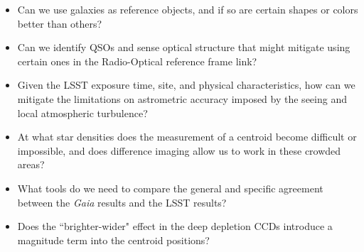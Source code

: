 \begin{itemize}
\item Can we use galaxies as reference objects, and if so are certain
shapes or colors better than others?
\item Can we identify QSOs and sense optical structure that might
mitigate using certain ones in the Radio-Optical reference frame link?
\item Given the LSST exposure time, site, and physical characteristics,
how can we mitigate the limitations on astrometric accuracy imposed
by the seeing and local atmospheric turbulence?
\item At what star densities does the measurement of a centroid become
difficult or impossible, and does difference imaging allow us to work
in these crowded areas?
\item What tools do we need to compare the general and specific agreement
between the {\it Gaia} results and the LSST results?
\item Does the ``brighter-wider" effect in the deep depletion CCDs introduce
a magnitude term into the centroid positions?
\end{itemize}

\navigationbar
